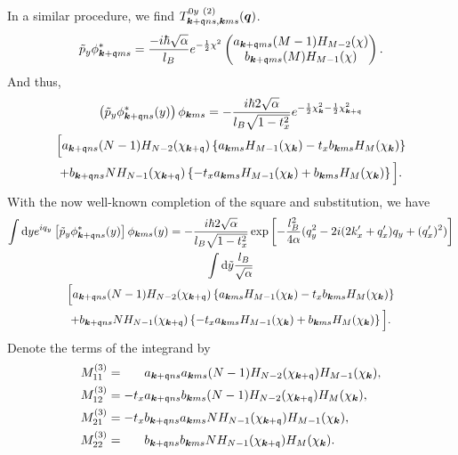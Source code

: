 In a similar procedure, we find \( T^{0y~(2)}_{\bm{k}+\mathfrak{q} ns, \bm{k} ms}(\bm{q}) \).
\begin{equation}
  \tilde{p}_y \phi^{*}_{\bm{k}+\mathfrak{q} m s} = \frac{-i \hbar \sqrt{\alpha } }{l_{B}}  e^{-\frac{1}{2} \chi ^2}
                                   \begin{pmatrix}
                                     a_{\bm{k}+\mathfrak{q} m s} (M-1) H_{M-2} (\chi) \\
                                     b_{\bm{k}+\mathfrak{q} m s} (M) H_{M-1} (\chi)
                                   \end{pmatrix}.
\end{equation}
And thus,
\begin{multline}
  \left( \tilde{p}_y \phi ^{*} _{\bm{k} + \mathfrak{q} ns} (y) \right) \phi _{\bm{k} m s}
  = -\frac{i\hbar 2 \sqrt{\alpha } }{l_{B} \sqrt{1 - t_{x}^2} }
  e^{-\frac{1}{2} \chi _{\bm{k}}^2 - \frac{1}{2} \chi _{\bm{k} + \mathfrak{q}} ^2}\\
  \Big[
  a_{\bm{k} + \mathfrak{q} ns} (N-1) H_{N-2}(\chi_{\bm{k}+\mathfrak{q}})
  \left\{a_{\bm{k} ms} H_{M-1} (\chi_{\bm{k}}) - t_{x} b_{\bm{k} ms} H_{M} (\chi_{\bm{k}})\right\}\\
  +
  b_{\bm{k} + \mathfrak{q} ns} N H_{N-1} (\chi_{\bm{k} + \mathfrak{q}})
  \left\{-t_{x} a_{\bm{k} ms}  H_{M-1} (\chi_{\bm{k}}) + b_{\bm{k} ms} H_{M} (\chi_{\bm{k}})\right\}
  \Big].
\end{multline}
With the now well-known completion of the square and substitution, we have
\begin{multline}
  \int \mathrm{d}y
  e^{i q_{y}}
  \left[\tilde{p}_y \phi ^{*}_{\bm{k} + \mathfrak{q} ns}(y) \right]
  \phi_{\bm{k} ms} (y)
  =
  - \frac{i\hbar 2 \sqrt{\alpha} }{l_{B} \sqrt{1 - t_{x}^2} }
  \exp
  \left[
    - \frac{l_{B}^2}{4 \alpha } (q_{y}^2 - 2 i (2k' _x + q' _x) q_{y} + (q' _x)^2 )
  \right  ]\\
  \int \mathrm{d} \tilde{y} \frac{l_{B}}{\sqrt{\alpha } }\\
  \Big[
  a_{\bm{k} + \mathfrak{q} ns} (N-1) H_{N-2}(\chi_{\bm{k}+\mathfrak{q}})
  \left\{a_{\bm{k} ms} H_{M-1} (\chi_{\bm{k}}) - t_{x} b_{\bm{k} ms} H_{M} (\chi_{\bm{k}})\right\}\\
  +
  b_{\bm{k} + \mathfrak{q} ns} N H_{N-1} (\chi_{\bm{k} + \mathfrak{q}})
  \left\{-t_{x} a_{\bm{k} ms}  H_{M-1} (\chi_{\bm{k}}) + b_{\bm{k} ms} H_{M} (\chi_{\bm{k}})\right\}
  \Big].
\end{multline}
Denote the terms of the integrand by
\begin{align}
  M^{(3)}_{11} &= \phantom{-t_x} a_{\bm{k} + \mathfrak{q} ns} a_{\bm{k} ms} (N-1) H_{N-2} (\chi_{\bm{k} + \mathfrak{q}}) H_{M-1} (\chi_{\bm{k}}),\\
  M^{(3)}_{12} &= -t_x a_{\bm{k} + \mathfrak{q} ns} b_{\bm{k} ms} (N-1) H_{N-2} (\chi_{\bm{k} + \mathfrak{q}}) H_{M} (\chi_{\bm{k}}),\\
  M^{(3)}_{21} &= -t_x b_{\bm{k} + \mathfrak{q} ns} a_{\bm{k} ms} N H_{N-1} (\chi_{\bm{k} + \mathfrak{q}}) H_{M-1} (\chi_{\bm{k}}),\\
  M^{(3)}_{22} &= \phantom{-t_x} b_{\bm{k} + \mathfrak{q} ns} b_{\bm{k} ms} N H_{N-1} (\chi_{\bm{k} + \mathfrak{q}}) H_{M} (\chi_{\bm{k}}).
\end{align}
